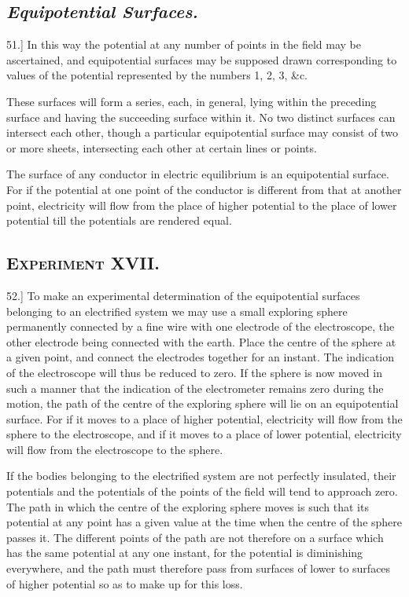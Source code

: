 \documentclass[12pt,oneside]{book}[2021/10/04]
\newcommand{\Heading}{\centering\normalfont}
\newcommand{\Section}[1]{\subsection*{\normalsize\Heading\scshape #1}}
\newcommand{\Subsection}[1]{\subsection*{\normalsize\Heading\itshape #1}}
\newcommand{\Runhead}[1]{\fancyhead[C]{\iffloatpage{}{\small#1}}}
\newcommand{\article}[1]{\phantomsection \label{art:#1}{#1.]}}
\newcommand{\¬}{\hphantom{0}}
\begin{document}
\Subsection{Equipotential Surfaces.}

\article{51} In this way the potential at any number of points in the
field may be ascertained, and equipotential surfaces may be supposed
drawn corresponding to values of the potential represented
by the numbers 1, 2, 3, \&c.

These surfaces will form a series, each, in general, lying within
the preceding surface and having the succeeding surface within it.
No two distinct surfaces can intersect each other, though a particular
equipotential surface may consist of two or more sheets,
intersecting each other at certain lines or points.

The surface of any conductor in electric equilibrium is an equipotential
surface. For if the potential at one point of the conductor
is different from that at another point, electricity will flow
from the place of higher potential to the place of lower potential
till the potentials are rendered equal.

\Section{Experiment XVII.}

\article{52} To make an experimental determination of the equipotential
surfaces belonging to an electrified system we may use a small
exploring sphere permanently connected by a fine wire with one
electrode of the electroscope, the other electrode being connected
with the earth. Place the centre of the sphere at a given point,
and connect the electrodes together for an instant. The indication of
the electroscope will thus be reduced to zero. If the sphere is now
moved in such a manner that the indication of the electrometer
remains zero during the motion, the path of the centre of the
exploring sphere will lie on an equipotential surface. For if it
moves to a place of higher potential, electricity will flow from the
sphere to the electroscope, and if it moves to a place of lower
potential, electricity will flow from the electroscope to the sphere.

If the bodies belonging to the electrified system are not perfectly
insulated, their potentials and the potentials of the points of the
field will tend to approach zero. The path in which the centre of
the exploring sphere moves is such that its potential at any point
has a given value at the time when the centre of the sphere passes
it. The different points of the path are not therefore on a surface
which has the same potential at any one instant, for the potential
is diminishing everywhere, and the path must therefore pass from
surfaces of lower to surfaces of higher potential so as to make up
for this loss.
\Runhead{RECIPROCAL METHOD.}
\end{document}
